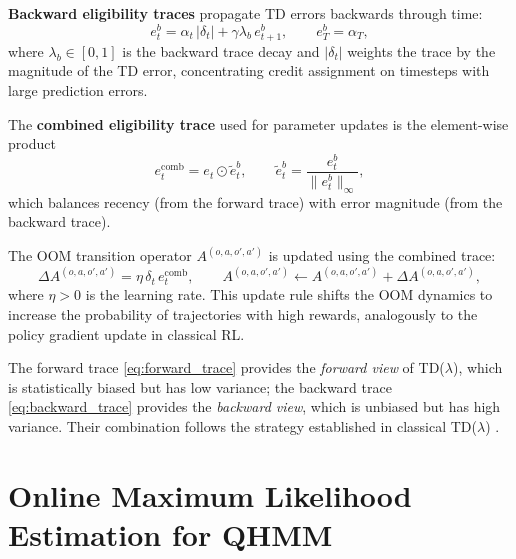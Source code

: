 \textbf{Backward eligibility traces} propagate TD errors backwards through
time:
\begin{equation}
e^b_t = \alpha_t \, |\delta_t| + \gamma \lambda_b \, e^b_{t+1},
\qquad e^b_T = \alpha_T,
\label{eq:backward_trace}
\end{equation}
where $\lambda_b \in [0,1]$ is the backward trace decay and $|\delta_t|$
weights the trace by the magnitude of the TD error, concentrating credit
assignment on timesteps with large prediction errors.

The \textbf{combined eligibility trace} used for parameter updates is the
element-wise product
\begin{equation}
e^{\mathrm{comb}}_t = e_t \odot \tilde e^b_t,
\qquad
\tilde e^b_t = \frac{e^b_t}{\|e^b_t\|_\infty},
\label{eq:combined_trace}
\end{equation}
which balances recency (from the forward trace) with error magnitude
(from the backward trace).

The OOM transition operator $A^{(o,a,o',a')}$ is updated using the
combined trace:
\begin{equation}
\Delta A^{(o,a,o',a')} = \eta \, \delta_t \, e^{\mathrm{comb}}_t,
\qquad A^{(o,a,o',a')} \leftarrow A^{(o,a,o',a')} + \Delta A^{(o,a,o',a')},
\label{eq:a_update}
\end{equation}
where $\eta > 0$ is the learning rate. This update rule shifts the OOM
dynamics to increase the probability of trajectories with high rewards,
analogously to the policy gradient update in classical RL.

The forward trace \eqref{eq:forward_trace} provides the \emph{forward
view} of TD($\lambda$), which is statistically biased but has low
variance; the backward trace \eqref{eq:backward_trace} provides the
\emph{backward view}, which is unbiased but has high variance. Their
combination follows the strategy established in classical TD($\lambda$)
\citep{sutton2000review}.



\section{Online Maximum Likelihood Estimation for QHMM}
\label{sec:omle}

